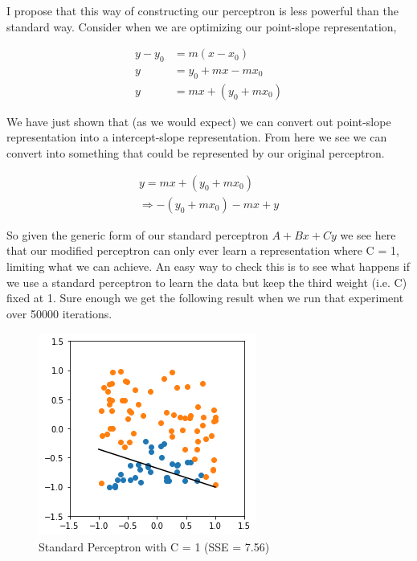 \documentclass{article}
\theoremstyle{definition}
\begin{document}
I propose that this way of constructing our perceptron is less powerful than the standard way. Consider when we are optimizing our point-slope representation, 

\begin{align*}
y - y_0 &= m(x - x_0) \\
y &= y_0 + mx - mx_0 \\
y &= mx + (y_0 + mx_0)
\end{align*}

We have just shown that (as we would expect) we can convert out point-slope representation into a intercept-slope representation. From here we see we can convert into something that could be represented by our original perceptron.

\begin{align*}
y = mx + (y_0 + mx_0)\\
\Rightarrow -(y_0 + mx_0) -mx + y
\end{align*}

So given the generic form of our standard perceptron $A + Bx + Cy$ we see here that our modified perceptron can only ever learn a representation where C = 1, limiting what we can achieve. An easy way to check this is to see what happens if we use a standard perceptron to learn the data but keep the third weight (i.e. C) fixed at 1. Sure enough we get the following result when we run that experiment over 50000 iterations.

\begin{figure}[H]
\centering
  \begin{minipage}[b]{0.4\textwidth}
    \includegraphics[width=\textwidth]{Standard-Perceptron-(C=1).png}
    \caption{Standard Perceptron with C = 1 (SSE = 7.56)}
  \end{minipage}
  \hfill
\end{figure}
\end{document}
